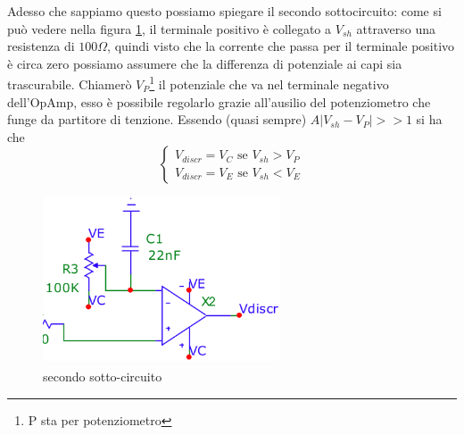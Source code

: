 \documentclass{article}
\begin{document}
			Adesso che sappiamo questo possiamo spiegare il secondo sottocircuito:
			come si può vedere nella figura \ref{fig:circ2}, il terminale positivo è collegato a $V_{sh}$ attraverso una resistenza di $100\Omega$, quindi visto che la corrente che passa per il terminale positivo è circa zero possiamo assumere che la differenza di potenziale ai capi sia trascurabile.\newline
			Chiamerò $V_P$\footnote{P sta per potenziometro} il potenziale che va nel terminale negativo dell'OpAmp, esso è possibile regolarlo grazie all'ausilio del potenziometro che funge da partitore di tenzione.\newline
			Essendo (quasi sempre) $A|V_{sh}-V_P|>>1$ si ha che 
			\begin{equation}
				\begin{cases}
					V_{discr}=V_C\textrm{ se } V_{sh}>V_P\\
					V_{discr}=V_E \textrm{ se } V_{sh}<V_E
				\end{cases}
			\end{equation}
			\begin{figure}
				\label{fig:circ2}
				\centering
				\includegraphics[width=70mm]{immagini/circ2a.png}
				\caption{secondo sotto-circuito}
			\end{figure}
\end{document}
